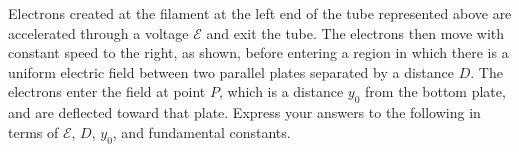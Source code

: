 \documentclass[12pt]{../../oss-apphys-exam}
\begin{document}
\begin{questions}
  \question Electrons created at the filament at the left end of the tube
  represented above are accelerated through a voltage $\mathcal E$ and exit the
  tube. The electrons then move with constant speed to the right, as shown,
  before entering a region in which there is a uniform electric field between
  two parallel plates separated by a distance $D$. The electrons enter the
  field at point $P$, which is a distance $y_0$ from the bottom plate, and are
  deflected toward that plate. Express your answers to the following in terms of
  $\mathcal E$, $D$, $y_0$, and fundamental constants.
\end{questions}
\end{document}
